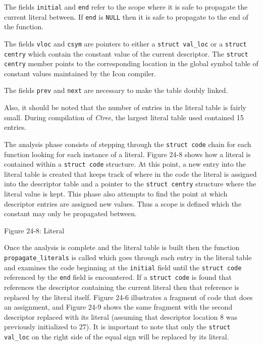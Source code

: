 The fields \texttt{initial} and \texttt{end} refer to the scope where
it is safe to propagate the current literal between. If \texttt{end}
is \texttt{NULL} then it is safe to propagate to the end of the
function.


The fields \texttt{vloc} and \texttt{csym} are pointers to either a
\texttt{struct val\_loc} or a \texttt{struct centry} which contain the
constant value of the current descriptor. The \texttt{struct centry}
member points to the corresponding location in the global symbol table
of constant values maintained by the Icon compiler.

The fields \texttt{prev} and \texttt{next} are necessary to make the
table doubly linked.

Also, it should be noted that the number of entries in the literal
table is fairly small. During compilation of \textit{Ctree}, the
largest literal table used contained 15 entries.

The analysis phase consists of stepping through the \texttt{struct
code} chain for each function looking for each instance of a
literal. Figure 24-8 shows how a literal is contained within a
\texttt{struct code} structure. At this point, a new entry into the
literal table is created that keeps track of where in the code the
literal is assigned into the descriptor table and a pointer to the
\texttt{struct centry} structure where the literal value is kept.
This phase also attempts to find the point at which descriptor entries
are assigned new values. Thus a scope is defined which the constant
may only be propagated between.


\bigskip

{\centering{}
Figure 24-8: Literal
\par}


Once the analysis is complete and the literal table is built then the
function \texttt{propagate\_literals} is called which goes through
each entry in the literal table and examines the code beginning at the
\texttt{initial} field until the \texttt{struct code} referenced by
the \texttt{end} field is encountered. If a \texttt{struct code} is
found that references the descriptor containing the current literal
then that reference is replaced by the literal itself. Figure 24-6
illustrates a fragment of code that does an assignment, and Figure
24-9 shows the same fragment with the second descriptor replaced with
its literal (assuming that descriptor location 8 was previously
initialized to 27). It is important to note that only the
\texttt{struct val\_loc} on the right side of the equal sign will be
replaced by its literal.


